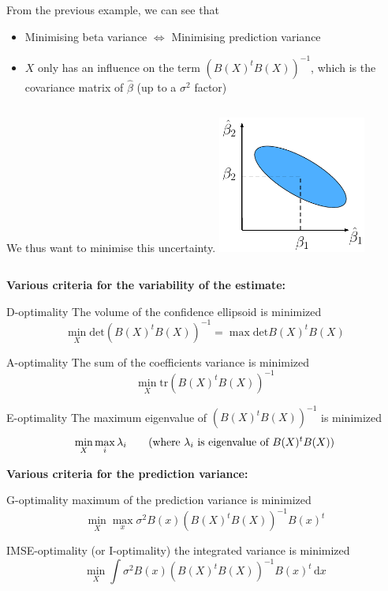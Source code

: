 \documentclass{beamer}
\newcommand\dx{\, \mathrm{d}}
\begin{document}
\begin{frame}{}
From the previous example, we can see that
\begin{itemize}
	\item Minimising beta variance $\Leftrightarrow$ Minimising prediction variance
	\item $X$ only has an influence on the term $(B(X)^t B(X))^{-1}$, which is the covariance matrix of $\hat{\beta}$ (up to a $\sigma^2$ factor)
\end{itemize}
\vspace{5mm}
\begin{columns}[c]
\column{3cm}
We thus want to minimise this uncertainty.
\column{5cm}
\includegraphics[height=4.5cm]{figures/latexdraw/optimalDoEreg}
\end{columns}
\end{frame}

\begin{frame}{}
\textbf{Various criteria for the variability of the estimate:}
\begin{block}{D-optimality}
	The volume of the confidence ellipsoid is minimized
	$$ \min_X \mathrm{det} (B(X)^t B(X))^{-1} = \max \mathrm{det} B(X)^t B(X)$$
\end{block}
\begin{block}{A-optimality}
	The sum of the coefficients variance is minimized
	$$ \min_X \mathrm{tr} (B(X)^t B(X))^{-1} $$
\end{block}
\begin{block}{E-optimality}
	The maximum eigenvalue of $(B(X)^t B(X))^{-1}$ is minimized
	$$ \min_X \max_i \lambda_i \text{\qquad (where $\lambda_i$ is eigenvalue of $B(X)^t B(X))$}$$
\end{block}
\end{frame}

\begin{frame}{}
\textbf{Various criteria for the prediction variance:}
\begin{block}{G-optimality}
	maximum of the prediction variance is minimized
	$$ \min_X \max_x \sigma^2 B(x) (B(X)^t B(X))^{-1} B(x)^t$$
\end{block}
\begin{block}{IMSE-optimality (or I-optimality)}
	the integrated variance is minimized
	$$ \min_X \int \sigma^2 B(x) (B(X)^t B(X))^{-1} B(x)^t \dx x$$
\end{block}
\end{frame}
\end{document}
